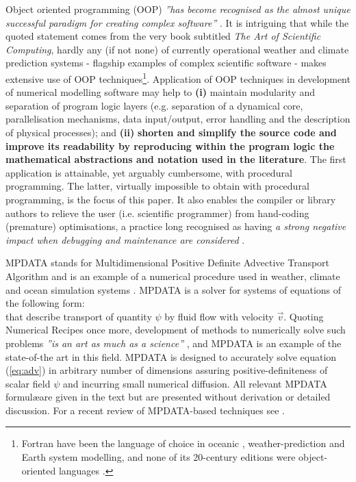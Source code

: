 \documentclass[final,5p,times,twocolumn]{elsarticle}
\begin{document}
  Object oriented programming (OOP) {\em ''has become recognised as the almost unique successful 
    paradigm for creating complex software''} \citep[][Sec.~1.3]{Press_et_al_2007}.
  It is intriguing that while the quoted statement comes from the very book subtitled 
   {\em The Art of Scientific Computing}, hardly any (if not none) of currently operational 
    weather and climate prediction systems - flagship examples of complex scientific software - 
    makes extensive use of OOP techniques\footnote{
  Fortran have been the language of choice in oceanic \citep{Griffies_et_al_2000}, 
    weather-prediction \citep{Sundberg_2009} and Earth system \citep{Legutke_2012} modelling, 
    and none of its 20-century editions were object-oriented languages \citep[see e.g.][for discussion]{Norton_et_al_2007}.}.
  Application of OOP techniques in development of numerical modelling software may help to
    {\bf (i)} maintain modularity and separation of program logic layers (e.g. separation of
      a dynamical core, parallelisation mechanisms, data input/output, error handling and
      the description of physical processes); and
    {\bf (ii)} {\bf shorten and simplify the source code and improve its readability by reproducing within 
      the program logic the mathematical abstractions and notation used in the literature}.
  The first application is attainable, yet arguably cumbersome, with procedural programming.
  The latter, virtually impossible to obtain with procedural programming, is the focus of this paper.
  It also enables the compiler or library authors to relieve the user (i.e. scientific programmer)
    from hand-coding (premature) optimisations, a practice long recognised as having {\em a strong negative impact when debugging
    and maintenance are considered} \citep{Knuth_1974}.

  MPDATA \citep{Smolarkiewicz_1984} stands for Multidimensional Positive Definite Advective Transport Algorithm and is
    an example of a numerical procedure used in weather, climate and ocean simulation systems
    \citep[e.g.][respectively]{Ziemianski_et_al_2011,Abiodun_et_al_2011,Ezer_et_al_2002}.
  MPDATA is a solver for systems of equations of the following form:
  \begin{equation}\label{eq:adv}
    
  \end{equation}
  that describe transport of quantity $\psi$ by fluid flow with velocity $\vec{v}$.
  Quoting Numerical Recipes once more, development of methods to numerically solve such problems 
    {\em ''is an art as much as a science''} \citep[][Sec.~20.1]{Press_et_al_2007},
    and MPDATA is an example of the state-of-the art in this field.
  MPDATA is designed to accurately solve equation (\ref{eq:adv}) in arbitrary
    number of dimensions assuring positive-definiteness of scalar field $\psi$ 
    and incurring small numerical diffusion.
  All relevant MPDATA formul\ae are given in the text but are presented without
    derivation or detailed discussion.
  For a recent review of MPDATA-based techniques see \citet[][and references therein]{Smolarkiewicz_2006}.
\end{document}

